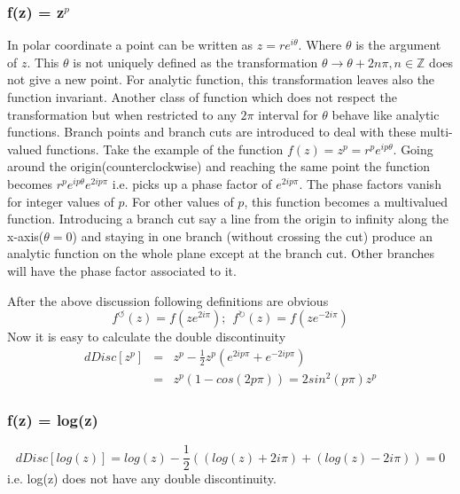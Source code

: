 \documentclass[12pt,a4paper,oneside]{book}
\theoremstyle{definition}
\begin{document}
        \subsubsection*{f(z) = z$^p$}
            In polar coordinate a point can be written as $z = re^{i\theta}$. Where $\theta$ is the argument of $z$. This $\theta$ is not uniquely defined as the transformation $\theta\to\theta+2n\pi, n\in\mathbb{Z}$ does not give a new point. For analytic function, this transformation leaves also the function invariant. Another class of function which does not respect the transformation but when restricted to any $2\pi$ interval for $\theta$ behave like analytic functions. Branch points and branch cuts are introduced to deal with these multi-valued functions. Take the example of the function $f(z) = z^p = r^pe^{ip\theta}$. Going around the origin(counterclockwise) and reaching the same point the function becomes $r^pe^{ip\theta}e^{2ip\pi}$ i.e. picks up a phase factor of $e^{2ip\pi}$. The phase factors vanish for integer values of $p$. For other values of $p$, this function becomes a multivalued function. Introducing a branch cut say a line from the origin to infinity along the x-axis($\theta=0$) and staying in one branch (without crossing the cut) produce an analytic function on the whole plane except at the branch cut. Other branches will have the phase factor associated to it.\par
            After the above discussion following definitions are obvious
            \begin{equation}
                f^{\circlearrowleft}(z) = f(ze^{2i\pi}); \hspace{5pt} f^{\circlearrowright}(z) = f(ze^{-2i\pi})
            \end{equation} 
            Now it is easy to calculate the double discontinuity
            \begin{eqnarray}
                dDisc[z^p] &=& z^p-\frac{1}{2}z^p(e^{2ip\pi}+e^{-2ip\pi})\nonumber\\
                &=& z^p(1-cos(2p\pi)) = 2sin^2(p\pi)z^p
            \end{eqnarray} 
        \subsubsection*{f(z) = log(z)}
            \begin{equation}
                dDisc[log(z)] = log(z) - \frac{1}{2}((log(z)+2i\pi)+(log(z)-2i\pi)) = 0
            \end{equation}
            i.e. log(z) does not have any double discontinuity.
\end{document}
